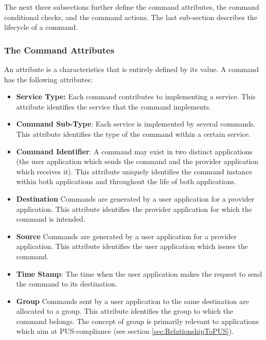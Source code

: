 The next three subsections further define the command attributes, the command conditional checks, and the command actions. The last sub-section describes the lifecycle of a command. 

\subsubsection{The Command Attributes}\label{sec:CmdAttributes}

An attribute is a characteristics that is entirely defined by its value. 
A command has the following attributes:

\begin{itemize}
\item \textbf{Service Type:} Each command contributes to implementing a service. This attribute identifies the service that the command implements. 

\item \textbf{Command Sub-Type}: Each service is implemented by several commands. 
This attribute identifies the type of the command within a certain service. 

\item \textbf{Command Identifier}: A command may exist in two distinct applications (the user application which sends the command and the provider application which receives it). This attribute uniquely identifies the command instance within both applications and throughout the life of both applications.

\item \textbf{Destination} Commands are generated by a user application for a provider application. This attribute identifies the provider application for which the command is intended.

\item \textbf{Source}
Commands are generated by a user application for a provider application. This attribute identifies the user application which issues the command.

\item \textbf{Time Stamp}:
The time when the user application makes the request to send the command to its destination. 

\item \textbf{Group}
Commands sent by a user application to the same destination are allocated to a group. This attribute identifies the group to which the command belongs. The concept of group is primarily relevant to applications which aim at PUS-compliance (see section \ref{sec:RelationshipToPUS}). 


\end{itemize}
